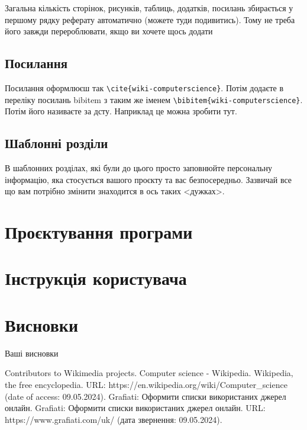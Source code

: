 \documentclass[a4paper, 14pt]{article}
\def\oldbibitem{} \let\oldbibitem=\bibitem
\def\bibitem{\stepcounter{citnum}\oldbibitem}
\begin{document}
Загальна кількість сторінок, рисунків, таблиць, додатків, посилань збирається у першому рядку реферату автоматично (можете туди подивитись). Тому не треба його завжди перероблювати, якщо ви хочете щось додати

\subsection{Посилання}

Посилання оформлюєш так \verb|\cite{wiki-computerscience}|\cite{wiki-computerscience}. Потім додаєте в переліку посилань bibitem з таким же іменем \verb|\bibitem{wiki-computerscience}|. Потім його називаєте за дсту. Наприклад це можна зробити тут\cite{dstu}.

\subsection{Шаблонні розділи}

В шаблонних розділах, які були до цього просто заповнюйте персональну інформацію, яка стосується вашого проєкту та вас безпосередньо. Зазвичай все що вам потрібно змінити знаходится в ось таких <дужках>.

\section{Проєктування програми}

\section{Інструкція користувача}


\section*{Висновки}
Ваші висновки

\raggedright %
\begin{thebibliography}{99} %
     Contributors to Wikimedia projects. Computer science - Wikipedia. Wikipedia, the free encyclopedia. URL: https://en.wikipedia.org/wiki/Computer\_science (date of access: 09.05.2024).
      Grafiati: Оформити списки використаних джерел онлайн. Grafiati: Оформити списки використаних джерел онлайн. URL: https://www.grafiati.com/uk/ (дата звернення: 09.05.2024).
\end{thebibliography}
\end{document}
